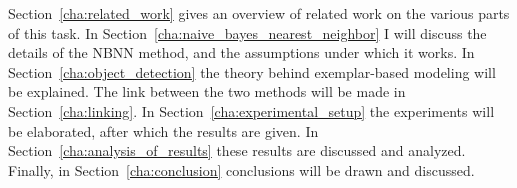 Section~\ref{cha:related_work} gives an overview of related work on the various parts of this task. In Section~\ref{cha:naive_bayes_nearest_neighbor} I will discuss the details of the NBNN method, and the assumptions under which it works. In Section~\ref{cha:object_detection} the theory behind exemplar-based modeling will be explained. The link between the two methods will be made in Section~\ref{cha:linking}. In Section~\ref{cha:experimental_setup} the experiments will be elaborated, after which the results are given. In Section~\ref{cha:analysis_of_results} these results are discussed and analyzed. Finally, in Section~\ref{cha:conclusion} conclusions will be drawn and discussed.

